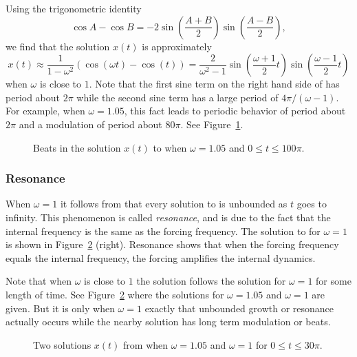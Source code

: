 \documentclass{ximera}
\begin{document}
Using the trigonometric identity
\[
\cos A - \cos B = -2\sin\left(\frac{A+B}{2}\right)
\sin\left(\frac{A-B}{2}\right),
\]
we find that the solution $x(t)$ is approximately
\begin{equation}  \label{e:x(t)reson3}
x(t) \approx  \frac{1}{1-\omega^2} (\cos(\omega t)-\cos(t))=
\frac{2}{\omega ^2-1}
\sin\left(\frac{\omega+1}{2}t\right)\sin\left(\frac{\omega-1}{2}t\right)
\end{equation}
when $\omega$ is close to $1$.  Note that the first sine term on the right hand
side of  has period about $2\pi$ while the second sine term 
has a large period of $4\pi/(\omega-1)$.  For example, when $\omega=1.05$, this
fact leads to periodic behavior of period about $2\pi$ and a 
modulation 
of period about $80\pi$.  See Figure~\ref{F:beats}.
\begin{figure}[htb]
           \centerline{%
           }
           \caption{Beats in the solution $x(t)$ to  
		when $\omega =1.05$ and $0\leq t\leq 100\pi$.}
           \label{F:beats}
\end{figure}  

\subsubsection*{Resonance}

When $\omega = 1$ it follows from  that every
solution to  is unbounded as $t$ goes to infinity.  This
phenomenon is called {\em resonance\/}, and is due to the fact that the
internal frequency is the same as the 
forcing frequency.  The solution
to  for $\omega=1$ is shown in Figure~\ref{F:reson} (right).
Resonance shows that when the forcing frequency equals the internal 
frequency, the forcing amplifies the internal dynamics.

Note that when $\omega$ is close to $1$ the solution follows the solution 
for $\omega =1$ for some length of time.  See Figure~\ref{F:reson} where 
the solutions for $\omega =1.05$ and $\omega =1$ are given.  But it is only 
when $\omega =1$ exactly that unbounded growth or resonance actually occurs 
while the nearby solution has long term modulation or beats.
\begin{figure}[htb]
           \centerline{%
           }
           \caption{Two solutions $x(t)$ from  when
                $\omega =1.05$ and $\omega =1$ for $0\leq t\leq 30\pi$.}
           \label{F:reson}
\end{figure}  
\end{document}
